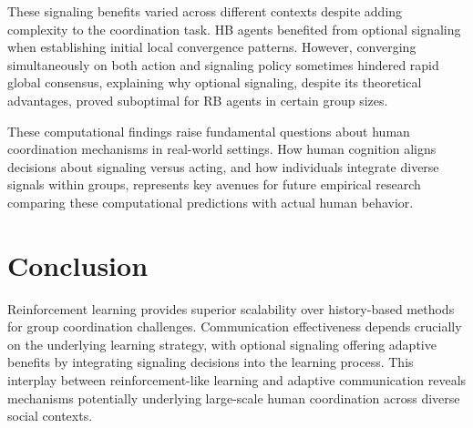 \documentclass[12pt,a4paper]{article}
\begin{document}
These signaling benefits varied across different contexts despite adding complexity to the coordination task. HB agents benefited from optional signaling when establishing initial local convergence patterns. However, converging simultaneously on both action and signaling policy sometimes hindered rapid global consensus, explaining why optional signaling, despite its theoretical advantages, proved suboptimal for RB agents in certain group sizes.

These computational findings raise fundamental questions about human coordination mechanisms in real-world settings. How human cognition aligns decisions about signaling versus acting, and how individuals integrate diverse signals within groups, represents key avenues for future empirical research comparing these computational predictions with actual human behavior.

\section{Conclusion}

Reinforcement learning provides superior scalability over history-based methods for group coordination challenges. Communication effectiveness depends crucially on the underlying learning strategy, with optional signaling offering adaptive benefits by integrating signaling decisions into the learning process. This interplay between reinforcement-like learning and adaptive communication reveals mechanisms potentially underlying large-scale human coordination across diverse social contexts.
\end{document}

